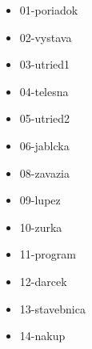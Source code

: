 



\begin{itemize}
\item 01-poriadok
\item 02-vystava
\item 03-utried1
\item 04-telesna
\item 05-utried2
\item 06-jablcka
\item 08-zavazia
\item 09-lupez
\item 10-zurka
\item 11-program
\item 12-darcek
\item 13-stavebnica
\item 14-nakup
\end{itemize}

